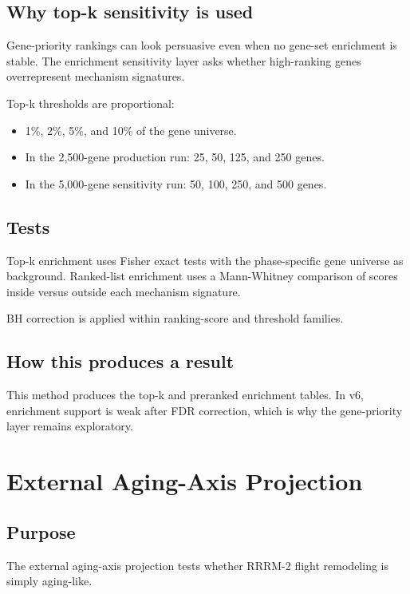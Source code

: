 \documentclass[11pt]{article}
\begin{document}
\subsection{Why top-k sensitivity is used}

Gene-priority rankings can look persuasive even when no gene-set enrichment is stable. The enrichment sensitivity layer asks whether high-ranking genes overrepresent mechanism signatures.

Top-k thresholds are proportional:

\begin{itemize}
  \item 1\%, 2\%, 5\%, and 10\% of the gene universe.
  \item In the 2,500-gene production run: 25, 50, 125, and 250 genes.
  \item In the 5,000-gene sensitivity run: 50, 100, 250, and 500 genes.
\end{itemize}

\subsection{Tests}

Top-k enrichment uses Fisher exact tests with the phase-specific gene universe as background. Ranked-list enrichment uses a Mann-Whitney comparison of scores inside versus outside each mechanism signature.

BH correction is applied within ranking-score and threshold families.

\subsection{How this produces a result}

This method produces the top-k and preranked enrichment tables. In v6, enrichment support is weak after FDR correction, which is why the gene-priority layer remains exploratory.

\section{External Aging-Axis Projection}

\subsection{Purpose}

The external aging-axis projection tests whether RRRM-2 flight remodeling is simply aging-like.
\end{document}

